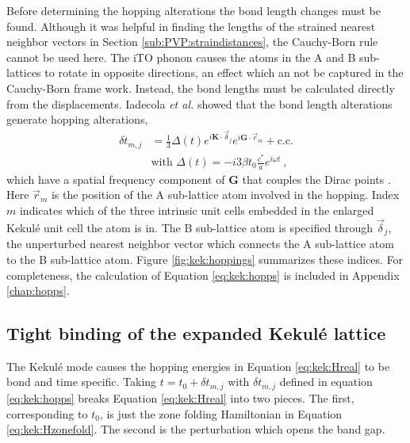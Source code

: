 Before determining the hopping alterations the bond length changes must be found.
Although it was helpful in finding the lengths of the strained nearest neighbor vectors in Section \ref{sub:PVP:straindistances}, the Cauchy-Born rule cannot be used here.
The iTO phonon causes the atoms in the A and B sub-lattices to rotate in opposite directions, an effect which an not be captured in the Cauchy-Born frame work.
Instead, the bond lengths must be calculated directly from the displacements.
Iadecola \textit{et al.} showed that the bond length alterations generate hopping alterations,
\begin{align}
	\delta t_{m,j}&=\frac{1}{3} \Delta(t) e^{i \bm{K} \cdot \vec{\delta}_j} e^{i \bm{G} \cdot \vec{r}_{m}}+\text{c.c.} \nonumber \\
	& \text{with } \Delta(t)=-i 3 \beta t_0 \frac{c^*}{a} e^{i \omega t} \label{eq:kek:hopps} \ ,
\end{align}
which have a spatial frequency component of $\bm{G}$ that couples the Dirac points \cite{Iadecola2013}.
Here $\vec{r}_{m}$ is the position of the A sub-lattice atom involved in the hopping.
Index $m$ indicates which of the three intrinsic unit cells embedded in the enlarged Kekul\'e unit cell the atom is in.
The B sub-lattice atom is specified through $\vec{\delta}_j$, the unperturbed nearest neighbor vector which connects the A sub-lattice atom to the B sub-lattice atom.
Figure \ref{fig:kek:hoppings} summarizes these indices.
For completeness, the calculation of Equation \ref{eq:kek:hopps} is included in Appendix \ref{chap:hopps}.

\subsection{Tight binding of the expanded Kekul\'e lattice}

The Kekul\'e mode causes the hopping energies in Equation \ref{eq:kek:Hreal} to be bond and time specific.
Taking $t=t_0+\delta t_{m,j}$ with $\delta t_{m,j}$ defined in equation \ref{eq:kek:hopps} breaks Equation \ref{eq:kek:Hreal} into two pieces.
The first, corresponding to $t_0$, is just the zone folding Hamiltonian in Equation \ref{eq:kek:Hzonefold}.
The second is the perturbation which opens the band gap.


